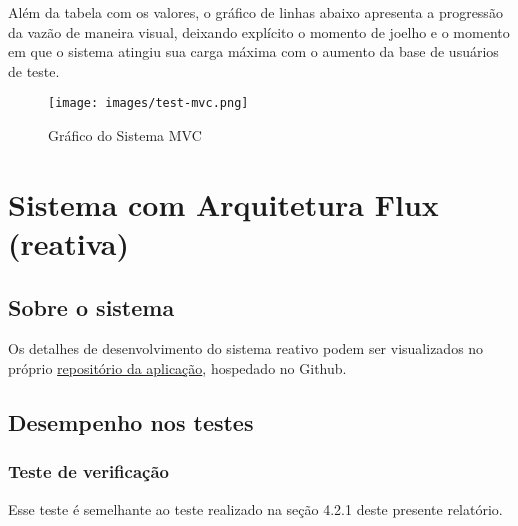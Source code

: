 \documentclass[12pt, openright, oneside, a4paper, article,
  section=TITLE
]{abntex2}
\begin{document}
Além da tabela com os valores, o gráfico de linhas abaixo apresenta a progressão da vazão de maneira visual, deixando explícito o momento de joelho e o momento em que o sistema atingiu sua carga máxima com o aumento da base de usuários de teste. 

\begin{figure}[htb]
  \begin{center}
    \texttt{[image: images/test-mvc.png]}
  \end{center}
  \caption{Gráfico do Sistema MVC}
\end{figure}

\section{Sistema com Arquitetura Flux (reativa)}

\subsection{Sobre o sistema}

Os detalhes de desenvolvimento do sistema reativo podem ser visualizados no próprio \href{https://github.com/arturo32/reservago-webflux}{repositório da aplicação}, hospedado no Github.

\subsection{Desempenho nos testes}

\subsubsection{Teste de verificação}

Esse teste é semelhante ao teste realizado na seção 4.2.1 deste presente relatório. 


\begin{table}[htb]
\end{table}
\end{document}
